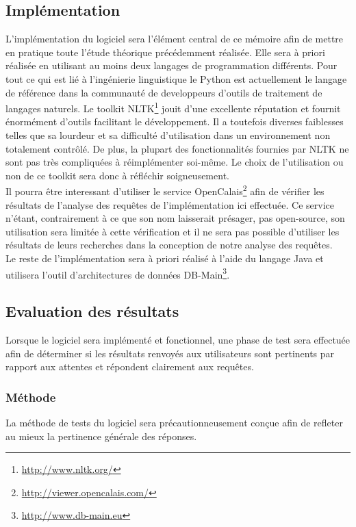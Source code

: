 \documentclass[a4paper,12pt]{article}
\begin{document}
\subsection{Implémentation}
L'implémentation du logiciel sera l'élément central de ce mémoire afin de mettre en pratique toute l'étude théorique précédemment réalisée.
Elle sera à priori réalisée en utilisant au moins deux langages de programmation différents.
Pour tout ce qui est lié à l'ingénierie linguistique le Python est actuellement le langage de référence dans la communauté de developpeurs d'outils de traitement de langages naturels.
Le toolkit NLTK\footnote{\url{http://www.nltk.org/}} jouit d'une excellente réputation et fournit énormément d'outils facilitant le développement.
Il a toutefois diverses faiblesses telles que sa lourdeur et sa difficulté d'utilisation dans un environnement non totalement contrôlé.
De plus, la plupart des fonctionnalités fournies par NLTK ne sont pas très compliquées à réimplémenter soi-même.
Le choix de l'utilisation ou non de ce toolkit sera donc à réfléchir soigneusement. \\

Il pourra être interessant d'utiliser le service OpenCalais\footnote{\url{http://viewer.opencalais.com/}} afin de vérifier les résultats de l'analyse des requêtes de l'implémentation ici effectuée.
Ce service n'étant, contrairement à ce que son nom laisserait présager, pas open-source, son utilisation sera limitée à cette vérification et il ne sera pas possible d'utiliser les résultats de leurs recherches dans la conception de notre analyse des requêtes. \\

Le reste de l'implémentation sera à priori réalisé à l'aide du langage Java et utilisera l'outil d'architectures de données DB-Main\footnote{\url{http://www.db-main.eu}}.
\subsection{Evaluation des résultats}
Lorsque le logiciel sera implémenté et fonctionnel, une phase de test sera effectuée afin de déterminer si les résultats renvoyés aux utilisateurs sont pertinents par rapport aux attentes et répondent clairement aux requêtes.
\subsubsection{Méthode}
La méthode de tests du logiciel sera précautionneusement conçue afin de refleter au mieux la pertinence générale des réponses. 
\end{document}
